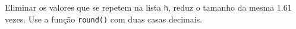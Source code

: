 \documentclass[12pt,varwidth=16cm,border=1pt]{standalone}
\begin{document}
Eliminar os valores que se repetem na lista \verb+h+, reduz o tamanho da mesma 1.61 vezes. Use a função \verb+round()+ com duas casas decimais.

\questiomtrue
\end{document}
